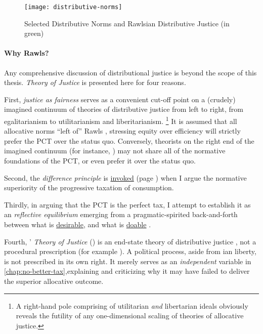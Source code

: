 \begin{figure}[htbp]
	\centering
	\texttt{[image: distributive-norms]}
	\caption[Selected Distributive Norms]{Selected Distributive Norms and Rawlsian Distributive Justice (in green)}
	\label{fig:distributive-norms}
\end{figure}

\paragraph{Why Rawls?}
Any comprehensive discussion of distributional justice is beyond the scope of this thesis.
\citeauthor{Rawls-1971} \emph{Theory of Justice} is presented here for four reasons.

First, \emph{justice as fairness} serves as a convenient cut-off point on a (crudely) imagined continuum of theories of distributive justice from left to right, from egalitarianism to utilitarianism and liberitarianism.
\footnote{
	A right-hand pole comprising of utilitarian \emph{and} libertarian ideals obviously reveals the futility of any one-dimensional scaling of theories of allocative justice.
}
It is assumed that all allocative norms ``left of'' Rawls \citep[such as][]{Cohen2000}, stressing equity over efficiency will strictly prefer the PCT over the status quo.
Conversely, theorists on the right end of the imagined continuum (for instance, \citealt{Nozick1974}) may not share all of the normative foundations of the PCT, or even prefer it over the status quo.

Second, the \emph{difference principle} is \hyperref[sec:foundational-beauty]{invoked} (page \pageref{sec:foundational-beauty}) when I argue the normative superiority of the progressive taxation of consumption.

Thirdly, in arguing that the PCT is the perfect tax, I attempt to establish it as an \emph{reflective equilibrium} \citep[49]{Rawls-1971} emerging from a pragmatic-spirited back-and-forth between what is \hyperref[sec:axiology]{desirable}, and what is \hyperref[sec:ontology]{doable} \citealt[856]{McCaffery2005}.

Fourth, \citeauthor{Rawls-1971}' \emph{Theory of Justice} (\citeyear{Rawls-1971}) is an end-state theory of distributive justice \citep[1007]{Fried1999}, not a procedural prescription (for example \citealt{Dahl-1989-aa}).
A political process, aside from \citeauthor{Rawls-1971}ian liberty, is not prescribed in its own right.
It merely serves as an \emph{independent} variable in \autoref{chap:no-better-tax},explaining and criticizing why it may have failed to deliver the superior allocative outcome.

